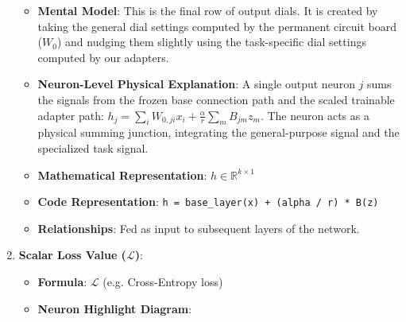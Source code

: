 \begin{enumerate}
\begin{itemize}
      \item \textbf{Mental Model}: This is the final row of output dials. It is created by taking the general dial settings computed by the permanent circuit board ($W_0$) and nudging them slightly using the task-specific dial settings computed by our adapters.
      \item \textbf{Neuron-Level Physical Explanation}: A single output neuron $j$ sums the signals from the frozen base connection path and the scaled trainable adapter path: $h_j = \sum_i W_{0, ji} x_i + \frac{\alpha}{r} \sum_m B_{jm} z_m$. The neuron acts as a physical summing junction, integrating the general-purpose signal and the specialized task signal.
      \item \textbf{Mathematical Representation}: $h \in \mathbb{R}^{k \times 1}$
      \item \textbf{Code Representation}: \texttt{h = base\_layer(x) + (alpha / r) * B(z)}
      \item \textbf{Relationships}: Fed as input to subsequent layers of the network.
    \end{itemize}

  \item \textbf{Scalar Loss Value ($\mathcal{L}$)}:
    \begin{itemize}
      \item \textbf{Formula}: $\mathcal{L}$ (e.g. Cross-Entropy loss)
      \item \textbf{Neuron Highlight Diagram}:

\begin{center}
\begin{adjustbox}{max width=0.85\linewidth}
\end{adjustbox}
\end{center}
\end{itemize}
\end{enumerate}

